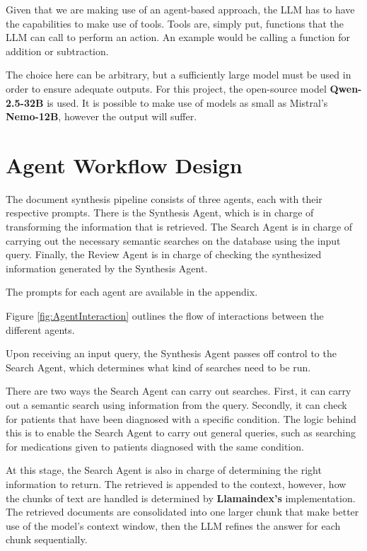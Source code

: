 Given that we are making use of an agent-based approach, the LLM has to have the capabilities to make use of tools. Tools are, simply put, functions that the LLM can call to perform an action. An example would be calling a function for addition or subtraction.

The choice here can be arbitrary, but a sufficiently large model must be used in order to ensure adequate outputs. For this project, the open-source model \textbf{Qwen-2.5-32B} is used. It is possible to make use of models as small as Mistral's \textbf{Nemo-12B}, however the output will suffer.

\section{Agent Workflow Design}

The document synthesis pipeline consists of three agents, each with their respective prompts.
There is the Synthesis Agent, which is in charge of transforming the information that is retrieved. The Search Agent is in charge of carrying out the necessary semantic searches on the database using the input query. Finally, the Review Agent is in charge of checking the synthesized information generated by the Synthesis Agent.

The prompts for each agent are available in the appendix.

Figure \ref{fig:AgentInteraction} outlines the flow of interactions between the different agents.

Upon receiving an input query, the Synthesis Agent passes off control to the Search Agent, which determines what kind of searches need to be run.

There are two ways the Search Agent can carry out searches. First, it can carry out a semantic search using information from the query. Secondly, it can check for patients that have been diagnosed with a specific condition. The logic behind this is to enable the Search Agent to carry out general queries, such as searching for medications given to patients diagnosed with the same condition.

At this stage, the Search Agent is also in charge of determining the right information to return. The retrieved is appended to the context, however, how the chunks of text are handled is determined by \textbf{Llamaindex's} implementation. The retrieved documents are consolidated into one larger chunk that make better use of the model's context window, then the LLM refines the answer for each chunk sequentially.

